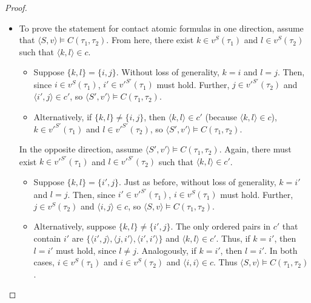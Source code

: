 \documentclass{article}
\newcommand{\lcont}{C}
\begin{document}
\begin{proof}
\begin{itemize}
\begin{itemize}
    \end{itemize}
  \item To prove the statement for contact atomic formulas in one direction, assume that $\langle S, v \rangle \models \lcont(\tau_1, \tau_2)$. From here, there exist $k \in v^S(\tau_1)$ and $l \in v^S(\tau_2)$ such that $\langle k, l \rangle \in c$.
    \begin{itemize}
    \item Suppose $\{k, l\} = \{i, j\}$. Without loss of generality, $k = i$ and $l = j$. Then, since $i \in v^S(\tau_1)$, $i' \in v'^{S'}(\tau_1)$ must hold. Further, $j \in v'^{S'}(\tau_2)$ and $\langle i', j \rangle \in c'$, so $\langle S', v' \rangle \models \lcont(\tau_1, \tau_2)$.
    \item Alternatively, if $\{k, l\} \neq \{i, j\}$, then $\langle k, l \rangle \in c'$ (because $\langle k, l \rangle \in c$), $k \in v'^{S'}(\tau_1)$ and $l \in v'^{S'}(\tau_2)$, so $\langle S', v' \rangle \models \lcont(\tau_1, \tau_2)$.
    \end{itemize}
    In the opposite direction, assume $\langle S', v' \rangle \models \lcont(\tau_1, \tau_2)$. Again, there must exist $k \in v'^{S'}(\tau_1)$ and $l \in v'^{S'}(\tau_2)$ such that $\langle k, l \rangle \in c'$.
    \begin{itemize}
    \item Suppose $\{k, l\} = \{i', j\}$. Just as before, without loss of generality, $k = i'$ and $l = j$. Then, since $i' \in v'^{S'}(\tau_1)$, $i \in v^S(\tau_1)$ must hold. Further, $j \in v^S(\tau_2)$ and $\langle i, j \rangle \in c$, so $\langle S, v \rangle \models \lcont(\tau_1, \tau_2)$.
    \item
      Alternatively, suppose $\{k, l\} \neq \{i', j\}$. The only ordered pairs in $c'$ that contain $i'$ are $\{\langle i', j \rangle, \langle j, i' \rangle, \langle i', i' \rangle\}$ and $\langle k, l \rangle \in c'$. Thus, if $k = i'$, then $l = i'$ must hold, since $l \neq j$. Analogously, if $k = i'$, then $l = i'$. In both cases, $i \in v^S(\tau_1)$ and $i \in v^S(\tau_2)$ and $\langle i, i \rangle \in c$. Thus $\langle S, v \rangle \models \lcont(\tau_1, \tau_2)$.


\end{itemize}
\end{itemize}
\end{proof}
\end{document}
